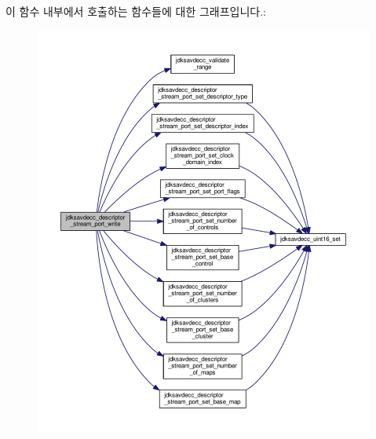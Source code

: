 이 함수 내부에서 호출하는 함수들에 대한 그래프입니다.\+:
\nopagebreak
\begin{figure}[H]
\begin{center}
\leavevmode
\includegraphics[width=350pt]{group__descriptor__stream__port_ga56f8b0752df170ed1901f7fdd44b998f_cgraph}
\end{center}
\end{figure}


